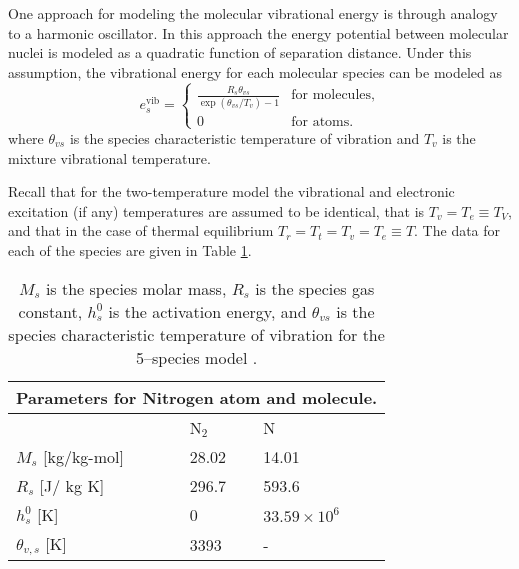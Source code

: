 \documentclass[10pt]{article}
\begin{document}
One approach for modeling the molecular vibrational energy is through analogy to a harmonic oscillator.  In this approach the energy potential between molecular nuclei is modeled as a quadratic function of separation distance\cite{Kirk2009}.  Under this assumption, the vibrational energy for each molecular species can be modeled as
\begin{equation}
  \label{eq:species_vibrational_energy}
  e^{\text{vib}}_s = 
  \begin{cases}    
    \frac{R_s\theta_{vs}}{\exp\left(\theta_{vs}/T_v\right) - 1} & \text{for molecules}, \\
    0 & \text{for atoms.}
  \end{cases}
\end{equation}
where $\theta_{vs}$ is the species characteristic temperature of vibration and $T_v$ is the mixture vibrational temperature.

Recall that for the two-temperature model the vibrational and electronic excitation (if any) temperatures are assumed to be identical, that is $T_v=T_e\equiv T_V$, and that in the case of thermal equilibrium $T_r=T_t=T_v=T_e\equiv T$.
The data for each of the species are given in Table \ref{table01}.


\begin{table}[htb]

\centering
\begin{tabular}{l l l}
\multicolumn{3}{c}{Parameters for Nitrogen atom and molecule.} \\
\hline\hline
 &     N$_2$     &  N  \\ [0.25ex]
\hline 
$M_s$ [kg/kg-mol]  & 28.02     &14.01               \vspace{2pt} \\
$R_s$ [J/ kg K]    & 296.7    &593.6               \vspace{2pt}\\
$h^0_s$ [K]        & 0        &$33.59\times 10^6$  \vspace{2pt}\\
$\theta_{v,s}$ [K] & 3393     &-                    \vspace{2pt}\\
\hline
\end{tabular}
\label{table01}
\caption{$M_s$ is the species molar mass,   $R_s$ is the species gas constant, $h^0_s$ is the activation energy, and $\theta_{vs}$ is the species characteristic temperature of vibration for the 5--species model \citep{Kessler2004}.}
\end{table}
\end{document}
